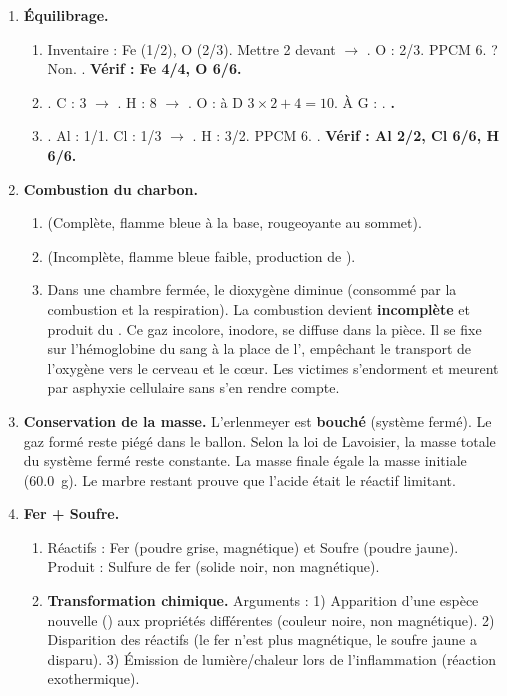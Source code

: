 \documentclass[11pt]{article}
\begin{document}
\begin{corrige}
\begin{enumerate}
\item \textbf{Équilibrage.}
\begin{enumerate}
\item Inventaire : Fe (1/2), O (2/3). Mettre 2 devant  $\to$ . O : 2/3. PPCM 6.  ? Non. . \textbf{Vérif : Fe 4/4, O 6/6.}
\item {}. C : 3 $\to$ . H : 8 $\to$ . O : à D $3\times2 + 4 = 10$. À G : . \textbf{.}
\item {}. Al : 1/1. Cl : 1/3 $\to$ . H : 3/2. PPCM 6. . \textbf{Vérif : Al 2/2, Cl 6/6, H 6/6.}
\end{enumerate}
\item \textbf{Combustion du charbon.}
\begin{enumerate}
\item {} (Complète, flamme bleue à la base, rougeoyante au sommet).
\item {} (Incomplète, flamme bleue faible, production de ).
\item Dans une chambre fermée, le dioxygène diminue (consommé par la combustion et la respiration). La combustion devient \textbf{incomplète} et produit du . Ce gaz incolore, inodore, se diffuse dans la pièce. Il se fixe sur l'hémoglobine du sang à la place de l', empêchant le transport de l'oxygène vers le cerveau et le cœur. Les victimes s'endorment et meurent par asphyxie cellulaire sans s'en rendre compte.
\end{enumerate}
\item \textbf{Conservation de la masse.} L'erlenmeyer est \textbf{bouché} (système fermé). Le gaz  formé reste piégé dans le ballon. Selon la loi de Lavoisier, la masse totale du système fermé reste constante. La masse finale égale la masse initiale (\SI{60,0}{g}). Le marbre restant prouve que l'acide était le réactif limitant.
\item \textbf{Fer + Soufre.}
\begin{enumerate}
\item Réactifs : Fer  (poudre grise, magnétique) et Soufre  (poudre jaune). Produit : Sulfure de fer  (solide noir, non magnétique).
\item \textbf{Transformation chimique.} Arguments : 1) Apparition d'une espèce nouvelle () aux propriétés différentes (couleur noire, non magnétique). 2) Disparition des réactifs (le fer n'est plus magnétique, le soufre jaune a disparu). 3) Émission de lumière/chaleur lors de l'inflammation (réaction exothermique).
\end{enumerate}
\end{enumerate}
\end{corrige}
\end{document}

